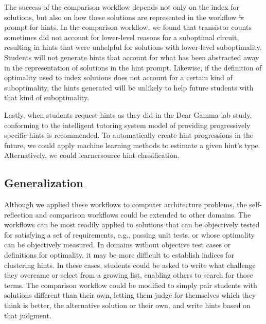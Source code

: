 \documentclass[12pt,twoside]{mitthesis}
\providecommand{\DIFdeltex}[1]{{\protect\color{red}\sout{#1}}}                      %
\providecommand{\DIFdelbegin}{} %
\providecommand{\DIFdelend}{} %
\providecommand{\DIFdel}[1]{\texorpdfstring{\DIFdeltex{#1}}{}} %
\begin{document}
{{{{{{{{{{The success of the comparison workflow depends not only on the index for solutions, but also on how these solutions are represented in the workflow \DIFdelbegin \DIFdel{'s }\DIFdelend prompt for hints. In the comparison workflow, we found that transistor counts sometimes did not account for lower-level reasons for a suboptimal circuit, resulting in hints that were unhelpful for solutions with lower-level suboptimality. Students will not generate hints that account for what has been abstracted away in the representation of solutions in the hint prompt. Likewise, if the definition of optimality used to index solutions does not account for a certain kind of suboptimality, the hints generated will be unlikely to help future students with that kind of suboptimality. 

Lastly, when students request hints as they did in the Dear Gamma lab study, conforming to the intelligent tutoring system model of providing progressively specific hints is recommended. To automatically create hint progressions in the future, we could apply machine learning methods to estimate a given hint's type. Alternatively, we could learnersource hint classification. 

\subsection{Generalization}
Although we applied these workflows to computer architecture problems, the self-reflection and comparison workflows could be extended to other domains. The workflows can be most readily applied to solutions that can be objectively tested for satisfying a set of requirements, e.g., passing unit tests, or whose optimality can be objectively measured. In domains without objective test cases or definitions for optimality, it may be more difficult to establish indices for clustering hints. In these cases, students could be asked to write what challenge they overcame or select from a growing list, enabling others to search for those terms. The comparison workflow could be modified to simply pair students with solutions different than their own, letting them judge for themselves which they think is better, the alternative solution or their own, and write hints based on that judgment.

}}}}}}}}}}
\end{document}
